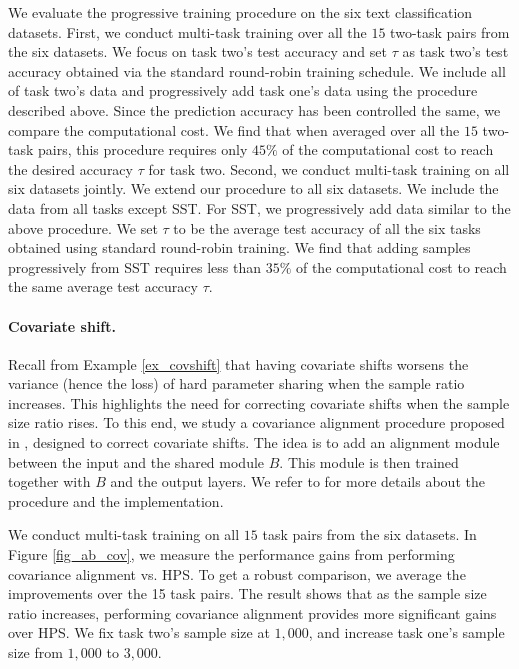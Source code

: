 We evaluate the progressive training procedure on the six text classification datasets.
First, we conduct multi-task training over all the $15$ two-task pairs from the six datasets.
We focus on task two's test accuracy and set $\tau$ as task two's test accuracy obtained via the standard round-robin training schedule.
We include all of task two's data and progressively add task one's data using the procedure described above.
Since the prediction accuracy has been controlled the same, we compare the computational cost.
We find that when averaged over all the $15$ two-task pairs, this procedure requires only $45\%$ of the computational cost to reach the desired accuracy $\tau$ for task two.
Second, we conduct multi-task training on all six datasets jointly.
We extend our procedure to all six datasets. We include the data from all tasks except SST. For SST, we progressively add data similar to the above procedure.
We set $\tau$ to be the average test accuracy of all the six tasks obtained using standard round-robin training.
We find that adding samples progressively from SST requires less than $35\%$ of the computational cost to reach the same average test accuracy $\tau$.







\paragraph{Covariate shift.}
Recall from Example \ref{ex_covshift} that having covariate shifts worsens the variance (hence the loss) of hard parameter sharing when the sample ratio increases.
This highlights the need for correcting covariate shifts when the sample size ratio rises.
To this end, we study a covariance alignment procedure proposed in \citet{WZR20}, designed to correct covariate shifts.
The idea is to add an alignment module between the input and the shared module $B$.
This module is then trained together with $B$ and the output layers. We refer to \citet{WZR20} for more details about the procedure and the implementation.

We conduct multi-task training on all $15$ task pairs from the six datasets.
In Figure \ref{fig_ab_cov}, we measure the performance gains from performing covariance alignment vs. HPS.
To get a robust comparison, we average the improvements over the 15 task pairs.
The result shows that as the sample size ratio increases, performing covariance alignment provides more significant gains over HPS.
We fix task two's sample size at $1,000$, and increase task one's sample size from $1,000$ to $3,000$.





